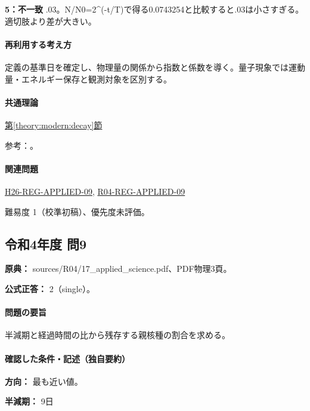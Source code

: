 \noindent\textbf{5：不一致} .03。N/N0=\allowbreak{}2\textasciicircum{}(-t/T)で得る0.0743254と比較すると.03は小さすぎる。 適切肢より差が大きい。\par

\paragraph{再利用する考え方} 定義の基準日を確定し、物理量の関係から指数と係数を導く。量子現象では運動量・エネルギー保存と観測対象を区別する。

\paragraph{共通理論} \hyperref[theory:modern:decay]{第\ref*{theory:modern:decay}節}

\par 参考：\cite{modern_mit_nuclear}。

\paragraph{関連問題} \hyperref[q:h26-reg-applied-09]{H26-REG-APPLIED-09}, \hyperref[q:r04-reg-applied-09]{R04-REG-APPLIED-09}

\par 難易度 1（校準初稿）、優先度未評価。

\subsection{令和4年度 問9}
\label{q:r04-reg-applied-09}

\noindent\textbf{原典：} sources/R04/17\_applied\_science.pdf、PDF物理3頁。

\textbf{公式正答：} 2（single）。

\paragraph{問題の要旨} 半減期と経過時間の比から残存する親核種の割合を求める。

\paragraph{確認した条件・記述（独自要約）}\mbox{}\par

\noindent\textbf{方向：} 最も近い値。\par

\noindent\textbf{半減期：} 9日\par

